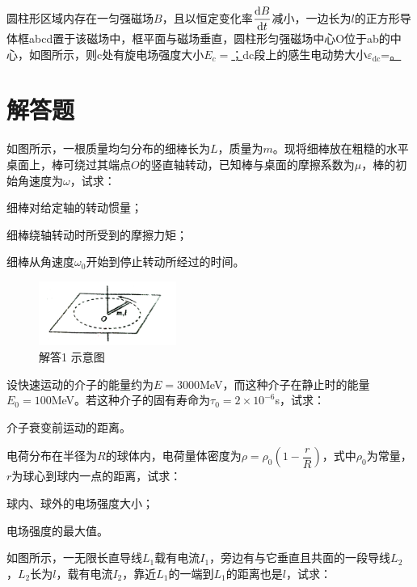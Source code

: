 圆柱形区域内存在一匀强磁场$B$，且以恒定变化率$\dfrac{\mathrm{d}B}{\mathrm{d}t}$减小，一边长为$l$的正方形导体框abcd置于该磁场中，框平面与磁场垂直，圆柱形匀强磁场中心O位于ab的中心，如图所示，则c处有旋电场强度大小$E_c=$\ul ；dc段上的感生电动势大小$\varepsilon_{\textrm{dc}}$=\ul。


\section{解答题}%
如图所示，一根质量均匀分布的细棒长为$L$，质量为$m$。现将细棒放在粗糙的水平桌面上，棒可绕过其端点$O$的竖直轴转动，已知棒与桌面的摩擦系数为$\mu$，棒的初始角速度为$\omega$，试求：%

细棒对给定轴的转动惯量；

细棒绕轴转动时所受到的摩擦力矩；

细棒从角速度$\omega_0$开始到停止转动所经过的时间。
\begin{figure}[!h]
	\begin{flushright}
		\includegraphics[width=0.4\textwidth]{2012_10.png}
		\caption{解答1 示意图}
	\end{flushright}
\end{figure}

设快速运动的介子的能量约为$E=3000$MeV，而这种介子在静止时的能量$E_0=100$MeV。若这种介子的固有寿命为$\tau_0=2\times 10^{-6}$s，试求：

介子衰变前运动的距离。

\vspace{10em}
电荷分布在半径为$R$的球体内，电荷量体密度为$\rho=\rho_0(1-\dfrac{r}{R})$，式中$\rho_0$为常量，$r$为球心到球内一点的距离，试求：

球内、球外的电场强度大小；

电场强度的最大值。

\vspace{10em}
如图所示，一无限长直导线$L_1$载有电流$I_1$，旁边有与它垂直且共面的一段导线$L_2$，$L_2$长为$l$，载有电流$I_2$，靠近$L_1$的一端到$L_1$的距离也是$l$，试求：

